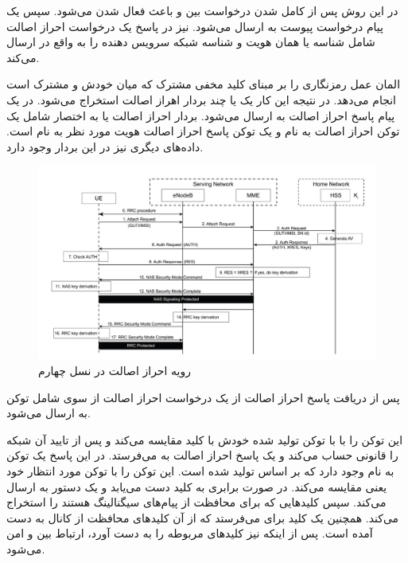 \Problem
{}
{
در این روش پس از کامل شدن درخواست
بین
و
باعث فعال شدن
می‌شود.
سپس یک پیام درخواست پیوست به
ارسال می‌شود.
نیز در پاسخ یک درخواست احراز اصالت شامل شناسه
یا همان هویت
و شناسه شبکه سرویس دهنده را به
واقع در
ارسال می‌کند.

المان
عمل رمزنگاری را بر مبنای کلید مخفی مشترک
که میان خودش و
مشترک است انجام می‌دهد.
در نتیجه این کار یک یا چند بردار اهراز اصالت استخراج می‌شود.
در یک پیام پاسخ احراز اصالت به
ارسال می‌شود.
بردار احراز اصالت یا به اختصار
شامل یک توکن احراز اصالت به نام
و یک توکن پاسخ احراز اصالت هویت مورد نظر به نام
است.
داده‌های دیگری نیز در این بردار وجود دارد.

\begin{figure}[H]
    \includegraphics[width=15cm]{Images/IMG_03.jpg}
    \centering
    \caption{رویه احراز اصالت در نسل چهارم}
\end{figure}

پس از دریافت پاسخ احراز اصالت از
یک درخواست احراز اصالت از سوی
شامل توکن
به
ارسال می‌شود.

این توکن را با با توکن تولید شده خودش با کلید
مقایسه می‌کند و پس از تایید آن شبکه را قانونی حساب می‌کند و یک پاسخ احراز اصالت به
می‌فرستد.
در این پاسخ یک توکن به نام
وجود دارد که بر اساس
تولید شده است.
این توکن را با توکن مورد انتظار خود یعنی
مقایسه می‌کند.
در صورت برابری 
به کلید دست می‌یابد و یک دستور
به
ارسال می‌کند.
سپس کلیدهایی که برای محافظت از پیام‌های سیگنالینگ
هستند را استخراج می‌کند.
همچنین
یک کلید برای
می‌فرستد که از آن کلیدهای محافظت از کانال
به دست آمده است.
پس از اینکه
نیز کلیدهای مربوطه را به دست آورد، ارتباط بین
و
امن می‌شود.
}